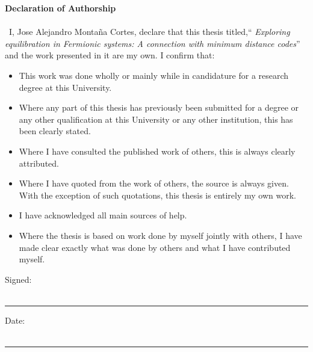 
\newpage{}
\textbf{\LARGE Declaration of Authorship}\\\\
\
I, Jose Alejandro Montaña Cortes, declare that this thesis titled,`` \textit{Exploring equilibration in Fermionic systems: A connection with minimum distance codes}'' and the work presented in it are my own. I confirm that:

\begin{itemize} 
\item This work was done wholly or mainly while in candidature for a research degree at this University.
\item Where any part of this thesis has previously been submitted for a degree or any other qualification at this University or any other institution, this has been clearly stated.
\item Where I have consulted the published work of others, this is always clearly attributed.
\item Where I have quoted from the work of others, the source is always given. With the exception of such quotations, this thesis is entirely my own work.
\item I have acknowledged all main sources of help.
\item Where the thesis is based on work done by myself jointly with others, I have made clear exactly what was done by others and what I have contributed myself.\\
\end{itemize}
 
\noindent Signed:\\\\

\rule[0.5em]{25em}{0.5pt} %
 
\noindent Date:\\\\

\rule[0.5em]{25em}{0.5pt} %
\newpage{}